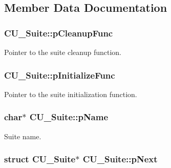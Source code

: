 \subsection{Member Data Documentation}
\hypertarget{struct_c_u___suite_aee36fd856e07775ba3cbb91af2219c25}{
\subsubsection[{p\+Cleanup\+Func}]{ C\+U\+\_\+\+Suite\+::p\+Cleanup\+Func}}\label{struct_c_u___suite_aee36fd856e07775ba3cbb91af2219c25}


Pointer to the suite cleanup function. 

\hypertarget{struct_c_u___suite_a572516b68f25492ac8e8ac720debfdb3}{
\subsubsection[{p\+Initialize\+Func}]{ C\+U\+\_\+\+Suite\+::p\+Initialize\+Func}}\label{struct_c_u___suite_a572516b68f25492ac8e8ac720debfdb3}


Pointer to the suite initialization function. 

\hypertarget{struct_c_u___suite_ac70274e00c1c5b7b6a8368c9a0ab6195}{
\subsubsection[{p\+Name}]{\setlength{\rightskip}{0pt plus 5cm}char$\ast$ C\+U\+\_\+\+Suite\+::p\+Name}}\label{struct_c_u___suite_ac70274e00c1c5b7b6a8368c9a0ab6195}


Suite name. 

\hypertarget{struct_c_u___suite_a695a5eb0087e2d64adc53da4518de69c}{
\subsubsection[{p\+Next}]{\setlength{\rightskip}{0pt plus 5cm}struct {\bf C\+U\+\_\+\+Suite}$\ast$ C\+U\+\_\+\+Suite\+::p\+Next}}\label{struct_c_u___suite_a695a5eb0087e2d64adc53da4518de69c}


